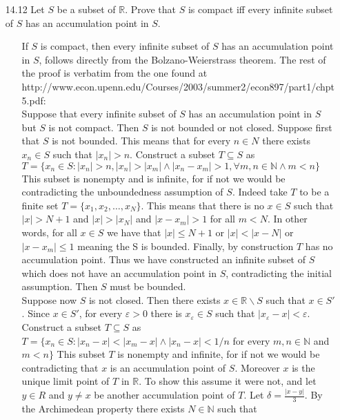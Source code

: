 \documentclass[12pt]{article}
\begin{document}
\begin{enumerate}
\item[14.12] Let $S$ be a subset of $\mathbb{R}$. Prove that $S$ is compact iff every infinite subset of $S$ has an accumulation point in $S$.
\begin{enumerate}
\item[] If $S$ is compact, then every infinite subset of $S$ has an accumulation point in $S$, follows
directly from the Bolzano-Weierstrass theorem. The rest of the proof is verbatim from the one found at \\
http://www.econ.upenn.edu/Courses/2003/summer2/econ897/part1/chpt5.pdf: 
\\ Suppose that every infinite subset of $S$ has an accumulation point in
$S$ but $S$ is not compact. Then $S$ is not bounded or not closed. Suppose first that $S$ is
not bounded. This means that for every $n \in N$ there exists $x_n \in S$ such that $|x_n| > n$.
Construct a subset $T \subseteq S$ as \\
$T = \{x_n \in S : |x_n| > n, |x_n| > |x_m| \wedge |x_n - x_m| > 1, \forall m,n \in \mathbb{N} \wedge m < n\}$
This subset is nonempty and is infinite, for if not we would be contradicting the
unboundedness assumption of $S$. Indeed take $T$ to be a finite set $T = \{x_1, x_2,\ldots,x_N\}$.
This means that there is no $x \in S$ such that $|x| > N + 1$ and $|x| > |x_N|$ and
$|x - x_m| > 1$ for all $m < N$. In other words, for all $x \in S$ we have that $|x| \leq N + 1$
or $|x| < |x-N|$ or $|x - x_m| \leq 1$ meaning the S is bounded. 
Finally, by construction $T$ has no accumulation point. 
Thus we have constructed an infinite subset of $S$ which
does not have an accumulation point in $S$, contradicting the initial assumption. Then $S$ must
be bounded. \\
Suppose now $S$ is not closed. Then there exists $x \in \mathbb{R}\backslash S$ such that $x \in S'$.
Since $x \in S'$, for every $\varepsilon > 0$ there is $x_\varepsilon \in S$ such that 
$|x_\varepsilon - x| < \varepsilon$. Construct a
subset $T \subseteq S$ as \\
$T = \{x_n \in S : |x_n - x| < |x_m - x| \wedge |x_n - x| < 1/n$ for every $m, n \in \mathbb{N}$ and $m< n\}$
This subset $T$ is nonempty and infinite, for if not we would be contradicting that $x$
is an accumulation point of $S$. Moreover $x$ is the unique limit point of $T$ in $\mathbb{R}$.
To show this assume it were not, and let $y \in R$ and $y \neq x$ be another accumulation point of $T$.
Let $\delta = \frac{|x - y|}{3}$. By the Archimedean property there exists $N \in \mathbb{N}$ such that 

\end{enumerate}
\end{enumerate}
\end{document}
